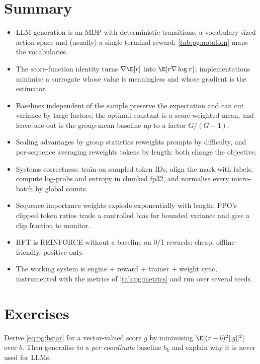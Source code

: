 \section{Summary}\label{sec:pg:summary}
\begin{itemize}
\item LLM generation is an MDP with deterministic transitions, a vocabulary-sized action space
  and (usually) a single terminal reward; \cref{tab:pg:notation} maps the vocabularies.
\item The score-function identity turns $\nabla\E[r]$ into $\E[r\nabla\log\pi]$; implementations
  minimise a surrogate whose value is meaningless and whose gradient is the estimator.
\item Baselines independent of the sample preserve the expectation and can cut variance by
  large factors; the optimal constant is a score-weighted mean, and leave-one-out is the
  group-mean baseline up to a factor $G/(G-1)$.
\item Scaling advantages by group statistics reweights prompts by difficulty, and per-sequence
  averaging reweights tokens by length: both change the objective.
\item Systems correctness: train on sampled token IDs, align the mask with labels, compute
  log-probs and entropy in chunked fp32, and normalise every micro-batch by global counts.
\item Sequence importance weights explode exponentially with length; PPO's clipped token ratios
  trade a controlled bias for bounded variance and give a clip fraction to monitor.
\item RFT is REINFORCE without a baseline on 0/1 rewards: cheap, offline-friendly, positive-only.
\item The working system is engine + reward + trainer + weight sync, instrumented with the
  metrics of \cref{tab:pg:metrics} and run over several seeds.
\end{itemize}

\section{Exercises}\label{sec:pg:exercises}

\begin{exercise}
Derive \cref{eq:pg:bstar} for a vector-valued score $g$ by minimising
$\E[(r-b)^2\|g\|^2]$ over $b$. Then generalise to a \emph{per-coordinate} baseline $b_k$ and
explain why it is never used for LLMs.
\end{exercise}


